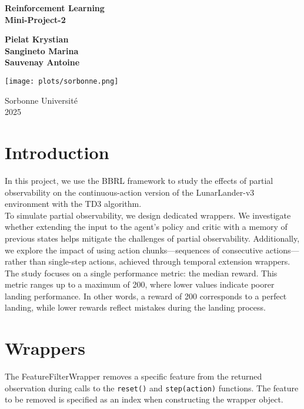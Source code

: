 \documentclass[12pt, a4paper]{article}
\begin{document}
\thispagestyle{empty}

\begin{center}
	{\bfseries \LARGE Reinforcement Learning \\[2mm]
	Mini-Project-2}

	\vfill

	{\large
	\textbf{Pielat Krystian} \\[2mm]
	\textbf{Sangineto Marina} \\[2mm]
	\textbf{Sauvenay Antoine}
	}

	\vfill

	\texttt{[image: plots/sorbonne.png]}

	\vfill

	{\large Sorbonne Université} \\[2mm]
	{\large 2025}
\end{center}

\newpage
\tableofcontents
\newpage

\section{Introduction}

In this project, we use the BBRL framework to study the effects of partial observability on the continuous-action version of the LunarLander-v3 environment with the TD3 algorithm.\\

To simulate partial observability, we design dedicated wrappers. We investigate whether extending the input to the agent’s policy and critic with a memory of previous states helps mitigate the challenges of partial observability. Additionally, we explore the impact of using action chunks—sequences of consecutive actions—rather than single-step actions, achieved through temporal extension wrappers.\\

The study focuses on a single performance metric: the median reward. This metric ranges up to a maximum of 200, where lower values indicate poorer landing performance. In other words, a reward of 200 corresponds to a perfect landing, while lower rewards reflect mistakes during the landing process.

\section{Wrappers}

The FeatureFilterWrapper removes a specific feature from the returned observation during calls to the \texttt{reset()} and \texttt{step(action)} functions. The feature to be removed is specified as an index when constructing the wrapper object.
\end{document}
